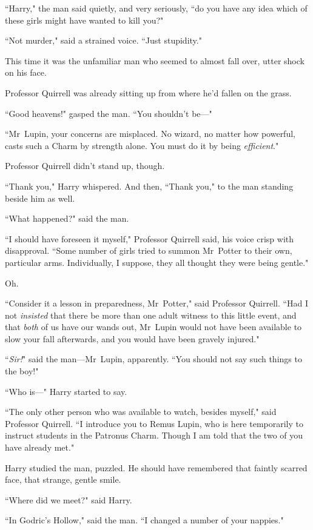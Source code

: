 ``Harry," the man said quietly, and very seriously, ``do you have any idea which of these girls might have wanted to kill you?"

``Not murder," said a strained voice. ``Just stupidity."

This time it was the unfamiliar man who seemed to almost fall over, utter shock on his face.

Professor Quirrell was already sitting up from where he'd fallen on the grass.

``Good heavens!" gasped the man. ``You shouldn't be—"

``Mr~Lupin, your concerns are misplaced. No wizard, no matter how powerful, casts such a Charm by strength alone. You must do it by being \emph{efficient}."

Professor Quirrell didn't stand up, though.

``Thank you," Harry whispered. And then, ``Thank you," to the man standing beside him as well.

``What happened?" said the man.

``I should have foreseen it myself," Professor Quirrell said, his voice crisp with disapproval. ``Some number of girls tried to summon Mr~Potter to their own, particular arms. Individually, I suppose, they all thought they were being gentle."

Oh.

``Consider it a lesson in preparedness, Mr~Potter," said Professor Quirrell. ``Had I not \emph{insisted} that there be more than one adult witness to this little event, and that \emph{both} of us have our wands out, Mr~Lupin would not have been available to slow your fall afterwards, and you would have been gravely injured."

``\emph{Sir!}" said the man—Mr~Lupin, apparently. ``You should not say such things to the boy!"

``Who is—" Harry started to say.

``The only other person who was available to watch, besides myself," said Professor Quirrell. ``I introduce you to Remus Lupin, who is here temporarily to instruct students in the Patronus Charm. Though I am told that the two of you have already met."

Harry studied the man, puzzled. He should have remembered that faintly scarred face, that strange, gentle smile.

``Where did we meet?" said Harry.

``In Godric's Hollow," said the man. ``I changed a number of your nappies."

